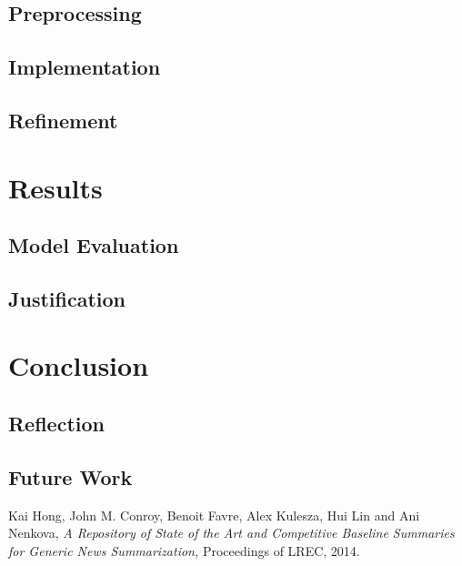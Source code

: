\documentclass{article}
\begin{document}
\subsection{Preprocessing}
\subsection{Implementation}
\subsection{Refinement}

\section{Results}
\subsection{Model Evaluation}
\subsection{Justification}

\section{Conclusion}
\subsection{Reflection}
\subsection{Future Work}

\begin{thebibliography}{99}
    Kai Hong, John M. Conroy, Benoit Favre, Alex Kulesza, Hui Lin and Ani Nenkova,
    \emph{A Repository of State of the Art and Competitive Baseline Summaries for Generic News Summarization,}
    Proceedings of LREC, 2014.
\end{thebibliography}
\end{document}
